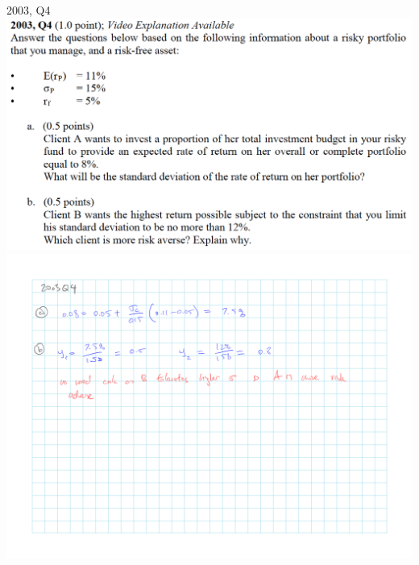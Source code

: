 \documentclass[]{book}
\theoremstyle{definition}
\theoremstyle{definition}
\theoremstyle{remark}
\begin{document}
 2003, Q4 \includegraphics{questions/2003-4Q.png}
\includegraphics{questions/2003-4A.png}
\end{document}
